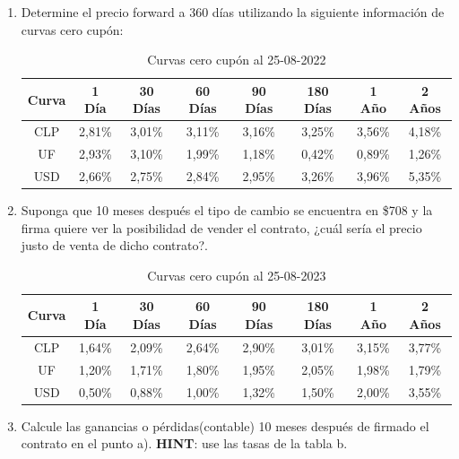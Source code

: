 \documentclass[12pt]{article}
\begin{document}
\begin{enumerate}[label=\textbf{\alph*)}]
\item Determine el precio forward a 360 días utilizando la siguiente información de curvas cero cupón:
\begin{table}[h!]
    \centering
    \caption{Curvas cero cupón al 25-08-2022}
    \begin{tabular}{c c c c c c c c}
    \toprule
    \textbf{Curva} & \textbf{1 Día} & \textbf{30 Días} & \textbf{60 Días} & \textbf{90 Días} & \textbf{180 Días} & \textbf{1 Año} & \textbf{2 Años} \\
    \midrule
    CLP & 2{,}81\% & 3{,}01\% & 3{,}11\% & 3{,}16\% & 3{,}25\% & 3{,}56\% & 4{,}18\% \\
    UF  & 2{,}93\% & 3{,}10\% & 1{,}99\% & 1{,}18\% & 0{,}42\% & 0{,}89\% & 1{,}26\% \\
    USD & 2{,}66\% & 2{,}75\% & 2{,}84\% & 2{,}95\% & 3{,}26\% & 3{,}96\% & 5{,}35\% \\
    \bottomrule
    \end{tabular}
\end{table}
\item	Suponga que 10 meses después el tipo de cambio se encuentra en \$708 y la firma quiere ver
la posibilidad de vender el contrato, ¿cuál sería el precio justo de venta de dicho contrato?.
\begin{table}[h!]
    \centering
    \caption{Curvas cero cupón al 25-08-2023}
    \begin{tabular}{c c c c c c c c}
    \toprule
    \textbf{Curva} & \textbf{1 Día} & \textbf{30 Días} & \textbf{60 Días} & \textbf{90 Días} & \textbf{180 Días} & \textbf{1 Año} & \textbf{2 Años} \\
    \midrule
    CLP & 1{,}64\% & 2{,}09\% & 2{,}64\% & 2{,}90\% & 3{,}01\% & 3{,}15\% & 3{,}77\% \\
    UF  & 1{,}20\% & 1{,}71\% & 1{,}80\% & 1{,}95\% & 2{,}05\% & 1{,}98\% & 1{,}79\% \\
    USD & 0{,}50\% & 0{,}88\% & 1{,}00\% & 1{,}32\% & 1{,}50\% & 2{,}00\% & 3{,}55\% \\
    \bottomrule
    \end{tabular}
\end{table}
\item Calcule las ganancias o pérdidas(contable) 10 meses después de firmado el contrato en el 
    punto a). \textbf{HINT}: use las tasas de la tabla b.
\end{enumerate}

\vspace{1em}
\end{document}
